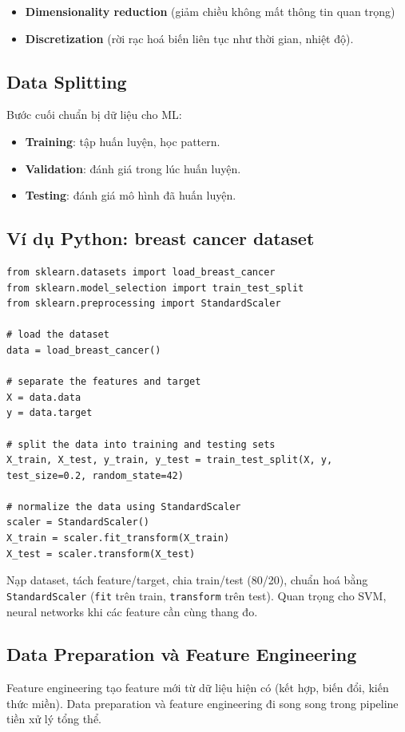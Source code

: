 \begin{phuongphap}[title={Kỹ thuật}]
\begin{itemize}
\item \textbf{Dimensionality reduction} (giảm chiều không mất thông tin quan trọng)
\item \textbf{Discretization} (rời rạc hoá biến liên tục như thời gian, nhiệt độ).
\end{itemize}
\end{phuongphap}

\subsection{Data Splitting}

\begin{dinhnghia}[title={Chia dữ liệu}]
Bước cuối chuẩn bị dữ liệu cho ML:
\begin{itemize}
  \item \textbf{Training}: tập huấn luyện, học pattern.
  \item \textbf{Validation}: đánh giá trong lúc huấn luyện.
  \item \textbf{Testing}: đánh giá mô hình đã huấn luyện.
\end{itemize}
\end{dinhnghia}

\subsection{Ví dụ Python: breast cancer dataset}

\begin{vidu}[title={load, split, StandardScaler}]
\begin{lstlisting}
from sklearn.datasets import load_breast_cancer
from sklearn.model_selection import train_test_split
from sklearn.preprocessing import StandardScaler

# load the dataset
data = load_breast_cancer()

# separate the features and target
X = data.data
y = data.target

# split the data into training and testing sets
X_train, X_test, y_train, y_test = train_test_split(X, y, test_size=0.2, random_state=42)

# normalize the data using StandardScaler
scaler = StandardScaler()
X_train = scaler.fit_transform(X_train)
X_test = scaler.transform(X_test)
\end{lstlisting}
Nạp dataset, tách feature/target, chia train/test (80/20), chuẩn hoá bằng \texttt{StandardScaler} (\texttt{fit} trên train, \texttt{transform} trên test).
Quan trọng cho SVM, neural networks khi các feature cần cùng thang đo.
\end{vidu}

\subsection{Data Preparation và Feature Engineering}

\begin{ynghia}[title={Hai mặt của tiền xử lý}]
Feature engineering tạo feature mới từ dữ liệu hiện có (kết hợp, biến đổi, kiến thức miền).
Data preparation và feature engineering đi song song trong pipeline tiền xử lý tổng thể.
\end{ynghia}
